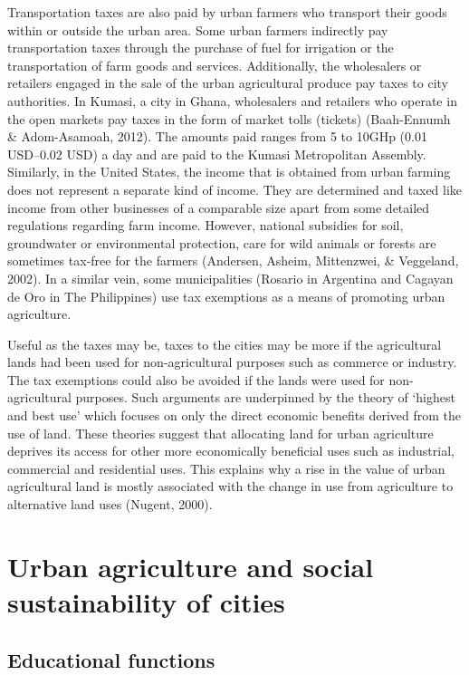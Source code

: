 Transportation taxes are also paid by urban farmers who transport their goods within or outside the urban area. Some urban farmers indirectly pay transportation taxes through the purchase of fuel for irrigation or the transportation of farm goods and services. Additionally, the wholesalers or retailers engaged in the sale of the urban agricultural produce pay taxes to city authorities. In Kumasi, a city in Ghana, wholesalers and retailers who operate in the open markets pay taxes in the form of market tolls (tickets) (Baah-Ennumh \& Adom-Asamoah, 2012). The amounts paid ranges from 5 to 10GHp (0.01 USD–0.02 USD) a day and are paid to the Kumasi Metropolitan Assembly. Similarly, in the United States, the income that is obtained from urban farming does not represent a separate kind of income. They are determined and taxed like income from other businesses of a comparable size apart from some detailed regulations regarding farm income. However, national subsidies for soil, groundwater or environmental protection, care for wild animals or forests are sometimes tax-free for the farmers (Andersen, Asheim, Mittenzwei, \& Veggeland, 2002). In a similar vein, some municipalities (Rosario in Argentina and Cagayan de Oro in The Philippines) use tax exemptions as a means of promoting urban agriculture.

Useful as the taxes may be, taxes to the cities may be more if the agricultural lands had been used for non-agricultural purposes such as commerce or industry. The tax exemptions could also be avoided if the lands were used for non-agricultural purposes. Such arguments are underpinned by the theory of ‘highest and best use’ which focuses on only the direct economic benefits derived from the use of land. These theories suggest that allocating land for urban agriculture deprives its access for other more economically beneficial uses such as industrial, commercial and residential uses. This explains why a rise in the value of urban agricultural land is mostly associated with the change in use from agriculture to alternative land uses (Nugent, 2000).

\section{Urban agriculture and social sustainability of cities}

\subsection{Educational functions}

